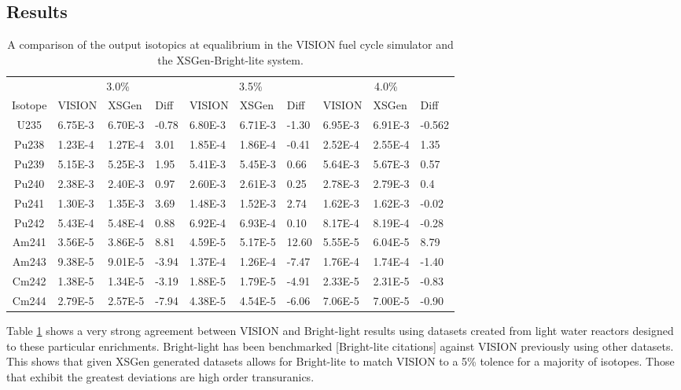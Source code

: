 \documentclass{article}
\newcommand\mTW{1.25cm}
\begin{document}
\subsection{Results}

\begin{table}[!htb]
\centering
\small
\caption{A comparison of the output isotopics at equalibrium in the VISION fuel cycle simulator and the XSGen-Bright-lite system.}
\label{tab:a}
\vspace{0.5em}
\hspace*{-5em}\begin{tabular}{|c| m{\mTW} m{\mTW} m{1cm}| m{\mTW} m{\mTW} m{1cm} | m{\mTW} m{\mTW} m{1cm} |}
 & \multicolumn{3}{c}{3.0\%} & \multicolumn{3}{c}{3.5\%} & \multicolumn{3}{c}{4.0\%} \\
Isotope & VISION & XSGen & Diff & VISION & XSGen & Diff & VISION & XSGen & Diff \\
\hline
U235 & 6.75E-3 & 6.70E-3 & -0.78 & 6.80E-3 & 6.71E-3 & -1.30 & 6.95E-3 & 6.91E-3 & -0.562 \\
Pu238 & 1.23E-4 & 1.27E-4 & 3.01 & 1.85E-4 & 1.86E-4 & -0.41 & 2.52E-4 & 2.55E-4 & 1.35 \\
Pu239 & 5.15E-3 & 5.25E-3 & 1.95 & 5.41E-3 & 5.45E-3 & 0.66 & 5.64E-3 & 5.67E-3 & 0.57 \\
Pu240 & 2.38E-3 & 2.40E-3 & 0.97 & 2.60E-3 & 2.61E-3 & 0.25 & 2.78E-3 & 2.79E-3 & 0.4 \\
Pu241 & 1.30E-3 & 1.35E-3 & 3.69 & 1.48E-3 & 1.52E-3 & 2.74 & 1.62E-3 & 1.62E-3 & -0.02 \\
Pu242 & 5.43E-4 & 5.48E-4 & 0.88 & 6.92E-4 & 6.93E-4 & 0.10 & 8.17E-4 & 8.19E-4 & -0.28 \\
Am241 & 3.56E-5 & 3.86E-5 & 8.81 & 4.59E-5 & 5.17E-5 & 12.60 & 5.55E-5 & 6.04E-5 & 8.79 \\
Am243 & 9.38E-5 & 9.01E-5 & -3.94 & 1.37E-4 & 1.26E-4 & -7.47 & 1.76E-4 & 1.74E-4 & -1.40 \\
Cm242 & 1.38E-5 & 1.34E-5 & -3.19 & 1.88E-5 & 1.79E-5 & -4.91 & 2.33E-5 & 2.31E-5 & -0.83 \\
Cm244 & 2.79E-5 & 2.57E-5 & -7.94 & 4.38E-5 & 4.54E-5 & -6.06 & 7.06E-5 & 7.00E-5 & -0.90 \\
\hline
\end{tabular}
\end{table}

Table \ref{tab:a} shows a very strong agreement between VISION and Bright-light results using datasets created from light water reactors designed to these particular enrichments. Bright-light has been benchmarked [Bright-lite citations] against VISION previously using other datasets. This shows that given XSGen generated datasets allows for Bright-lite to match VISION to a 5\% tolence for a majority of isotopes. Those that exhibit the greatest deviations are high order transuranics.
\end{document}
